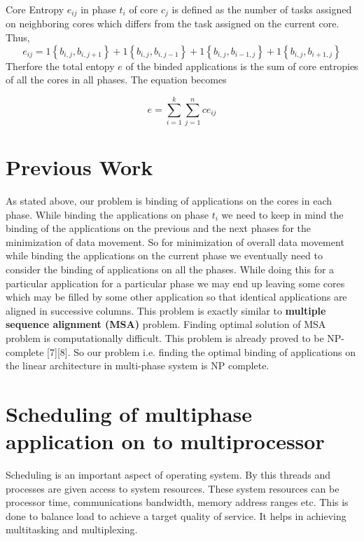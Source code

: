 \documentclass[10pt, conference]{IEEEtran}
\begin{document}
Core Entropy $e_{ij}$ in phase $t_i$ of core $c_j$ is defined as the number of tasks assigned on neighboring cores which differs from the task assigned on the current core. Thus,
\begin{equation} 
e_{ij} = 1\left \{ b_{i,j},b_{i,j+1} \right \} + 1\left \{ b_{i,j},b_{i,j-1} \right \} + 1\left \{ b_{i,j},b_{i-1,j} \right \} + 1\left \{ b_{i,j},b_{i+1,j} \right \} 
\label{ce}
\end{equation} 
Therfore the total entopy $e$ of the binded applications is the sum of core entropies of all the cores in all phases. The equation becomes

\begin{equation} 
e = \sum_{i=1}^{k}\sum_{j=1}^{n}ce_{ij}
\label{totalentropy}
\end{equation}

\section{Previous Work}

As stated above, our problem is binding of applications on the cores in each phase. While binding the applications on phase $t_i$ we need to keep in mind the binding of the applications on the previous and the next phases for the minimization of data movement. So for minimization of overall data movement while binding the applications on the current phase we eventually need to consider the binding of applications on all the phases. While doing this for a particular application for a particular phase we may end up leaving some cores which may be filled by some other application so that identical applications are aligned in successive columns. This problem is exactly similar to {\bf multiple sequence alignment (MSA)} problem. Finding optimal solution of MSA problem is computationally difficult. This problem is already proved to be NP-complete \cite{Wang94}[7][8]. So our problem i.e. finding the optimal binding of applications on the linear architecture in multi-phase system is NP complete.
\section{Scheduling of multiphase application on to multiprocessor}
Scheduling is an important aspect of operating system. By this threads and processes are given access to system resources. These system resources can be processor time, communications bandwidth, memory address ranges etc. This is done to balance load to achieve a target quality of service. It helps in achieving multitasking and multiplexing. 
\end{document}
